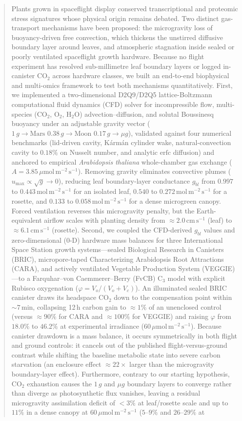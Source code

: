 \documentclass[preprint,11pt,numbers,sort&compress]{elsarticle}
\newcommand{\ums}{\ensuremath{\mu\mathrm{mol\,m^{-2}\,s^{-1}}}}
\newcommand{\cmsu}{\ensuremath{\mathrm{cm\,s^{-1}}}}
\newcommand{\molms}{\ensuremath{\mathrm{mol\,m^{-2}\,s^{-1}}}}
\begin{document}
\begin{frontmatter}
\begin{abstract}
Plants grown in spaceflight display conserved transcriptional and proteomic stress signatures whose physical origin remains debated. Two distinct gas-transport mechanisms have been proposed: the microgravity loss of buoyancy-driven free convection, which thickens the unstirred diffusive boundary layer around leaves, and atmospheric stagnation inside sealed or poorly ventilated spaceflight growth hardware. Because no flight experiment has resolved sub-millimetre leaf boundary layers or logged in-canister $\mathrm{CO_2}$ across hardware classes, we built an end-to-end biophysical and multi-omics framework to test both mechanisms quantitatively. First, we implemented a two-dimensional D2Q9/D2Q5 lattice-Boltzmann computational fluid dynamics (CFD) solver for incompressible flow, multi-species ($\mathrm{CO_2}$, $\mathrm{O_2}$, $\mathrm{H_2O}$) advection--diffusion, and solutal Boussinesq buoyancy under an adjustable gravity vector ($1\,g \to \text{Mars } 0.38\,g \to \text{Moon } 0.17\,g \to \mu g$), validated against four numerical benchmarks (lid-driven cavity, K\'arm\'an cylinder wake, natural-convection cavity to $0.18\%$ on Nusselt number, and analytic $\mathrm{erfc}$ diffusion) and anchored to empirical \textit{Arabidopsis thaliana} whole-chamber gas exchange ($A = 3.85\,\ums$). Removing gravity eliminates convective plumes ($u_{\max}\propto\sqrt{g}\to 0$), reducing leaf boundary-layer conductance $g_{bl}$ from $0.997$ to $0.443\,\molms$ for an isolated leaf, $0.540$ to $0.272\,\molms$ for a rosette, and $0.133$ to $0.058\,\molms$ for a dense microgreen canopy. Forced ventilation reverses this microgravity penalty, but the Earth-equivalent airflow scales with planting density from $\approx 2.0\,\cmsu$ (leaf) to $\approx 6.1\,\cmsu$ (rosette). Second, we coupled the CFD-derived $g_{bl}$ values and zero-dimensional (0-D) hardware mass balances for three International Space Station growth systems---sealed Biological Research in Canisters (BRIC), micropore-taped Characterizing Arabidopsis Root Attractions (CARA), and actively ventilated Vegetable Production System (VEGGIE)---to a Farquhar--von Caemmerer--Berry (FvCB) $\mathrm{C_3}$ model with explicit Rubisco oxygenation ($\varphi = V_o/(V_o+V_c)$). An illuminated sealed BRIC canister draws its headspace $\mathrm{CO_2}$ down to the compensation point within $\sim 7\,\mathrm{min}$, collapsing 12\,h carbon gain to $\approx 1\%$ of an unenclosed control (versus $\approx 90\%$ for CARA and $\approx 100\%$ for VEGGIE) and raising $\varphi$ from $18.0\%$ to $46.2\%$ at experimental irradiance ($60\,\ums$). Because canister drawdown is a mass balance, it occurs symmetrically in both flight and ground controls: it cancels out of the published flight-versus-ground contrast while shifting the baseline metabolic state into severe carbon starvation (an enclosure effect $\approx 22\times$ larger than the microgravity boundary-layer effect). Furthermore, contrary to our starting hypothesis, $\mathrm{CO_2}$ exhaustion causes the $1\,g$ and $\mu g$ boundary layers to converge rather than diverge as photosynthetic flux vanishes, leaving a residual microgravity assimilation deficit of $<3\%$ at leaf/rosette scale and up to $11\%$ in a dense canopy at $60\,\ums$ ($5\text{--}9\%$ and $26\text{--}29\%$ at 
\end{abstract}
\end{frontmatter}
\end{document}
